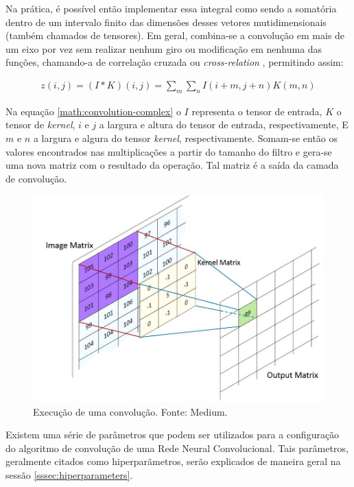Na prática, é possível então implementar essa integral como sendo a somatória dentro de um intervalo finito das dimensões desses vetores mutidimensionais (também chamados de tensores). Em geral, combina-se a convolução em mais de um eixo por vez sem realizar nenhum giro ou modificação em nenhuma das funções, chamando-a de correlação cruzada ou \textit{cross-relation} \cite{goodfellow-et-al-2016}, permitindo assim:

\begin{gather}
  z(i, j) = (I * K)(i, j) = \sum_{m} \sum_{n} I(i + m, j + n)K(m,n)
  \label{math:convolution-complex}
\end{gather}

Na equação \ref{math:convolution-complex} o \(I\) representa o tensor de entrada, \(K\) o tensor de \textit{kernel}, \(i\) e \(j\) a largura e altura do tensor de entrada, respectivamente, E \(m\) e \(n\) a largura e algura do tensor \textit{kernel}, respectivamente. Somam-se então os valores encontrados nas multiplicações a partir do tamanho do filtro e gera-se uma nova matriz com o resultado da operação. Tal matriz é a saída da camada de convolução.

\begin{figure}[H]
  \centering
  \includegraphics[scale=0.35]{figuras/cnn-kernel-multiplication.jpeg}
  \caption{Execução de uma convolução. Fonte: Medium.}
  \label{fig:cnn-kernel-multiplication}
\end{figure}

Existem uma série de parâmetros que podem ser utilizados para a configuração do algoritmo de convolução de uma Rede Neural Convolucional. Tais parâmetros, geralmente citados como hiperparãmetros, serão explicados de maneira geral na sessão \ref{sssec:hiperparameters}.

